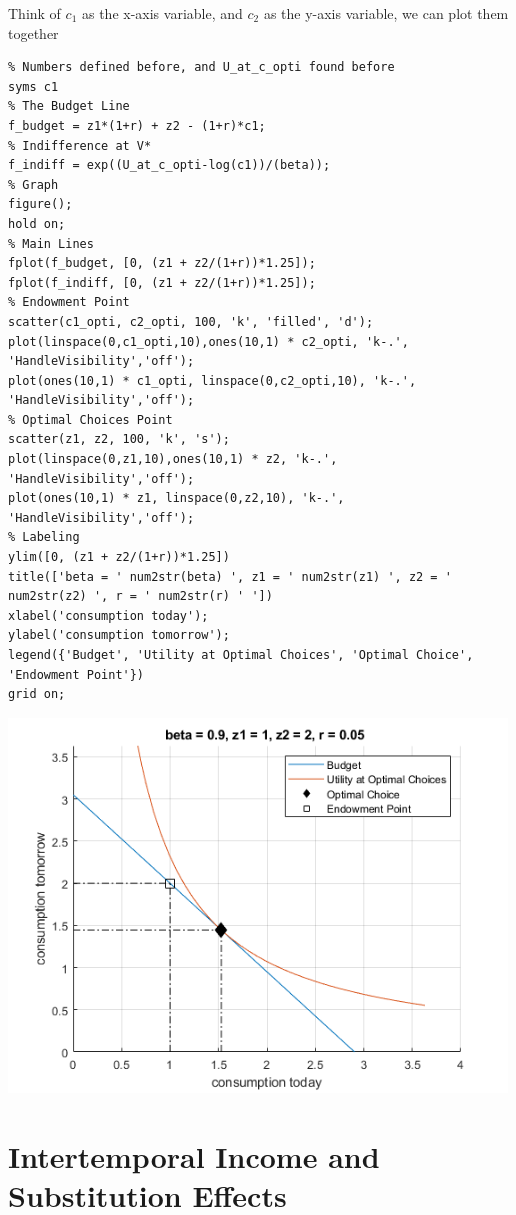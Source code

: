 \documentclass[
]{book}
\begin{document}
Think of \(c_1\) as the x-axis variable, and \(c_2\) as the y-axis variable,
we can plot them together

\begin{verbatim}
% Numbers defined before, and U_at_c_opti found before
syms c1
% The Budget Line
f_budget = z1*(1+r) + z2 - (1+r)*c1;
% Indifference at V*
f_indiff = exp((U_at_c_opti-log(c1))/(beta));
% Graph
figure();
hold on;
% Main Lines
fplot(f_budget, [0, (z1 + z2/(1+r))*1.25]);
fplot(f_indiff, [0, (z1 + z2/(1+r))*1.25]);
% Endowment Point
scatter(c1_opti, c2_opti, 100, 'k', 'filled', 'd');
plot(linspace(0,c1_opti,10),ones(10,1) * c2_opti, 'k-.', 'HandleVisibility','off');
plot(ones(10,1) * c1_opti, linspace(0,c2_opti,10), 'k-.', 'HandleVisibility','off');
% Optimal Choices Point
scatter(z1, z2, 100, 'k', 's');
plot(linspace(0,z1,10),ones(10,1) * z2, 'k-.', 'HandleVisibility','off');
plot(ones(10,1) * z1, linspace(0,z2,10), 'k-.', 'HandleVisibility','off');
% Labeling
ylim([0, (z1 + z2/(1+r))*1.25])
title(['beta = ' num2str(beta) ', z1 = ' num2str(z1) ', z2 = ' num2str(z2) ', r = ' num2str(r) ' '])
xlabel('consumption today');
ylabel('consumption tomorrow');
legend({'Budget', 'Utility at Optimal Choices', 'Optimal Choice', 'Endowment Point'})
grid on;
\end{verbatim}

\includegraphics[width=5.20833in,height=\textheight]{img/household_c1_c2_constrained_expmin_images/figure_0.png}

\hypertarget{intertemporal-income-and-substitution-effects}{%
\section{Intertemporal Income and Substitution Effects}\label{intertemporal-income-and-substitution-effects}}
\end{document}
